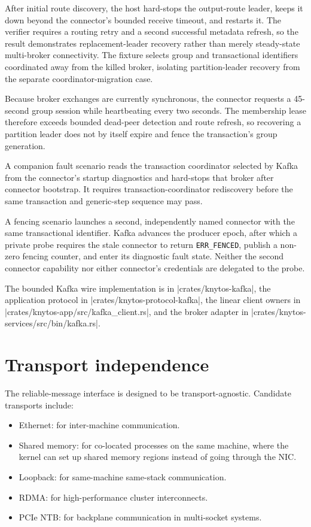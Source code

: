 After
initial route discovery, the host hard-stops the output-route leader, keeps it
down beyond the connector's bounded receive timeout, and restarts it. The
verifier requires a routing retry and a second successful metadata refresh, so the
result demonstrates replacement-leader recovery rather than merely
steady-state multi-broker connectivity. The fixture selects group and
transactional identifiers coordinated away from the killed broker, isolating
partition-leader recovery from the separate coordinator-migration case.

Because broker exchanges are currently synchronous, the connector requests a
45-second group session while heartbeating every two seconds. The membership
lease therefore exceeds bounded dead-peer detection and route refresh, so
recovering a partition leader does not by itself expire and fence the
transaction's group generation.

A companion fault scenario reads the transaction coordinator selected by
Kafka from the connector's startup diagnostics and hard-stops that broker
after connector bootstrap. It requires transaction-coordinator rediscovery
before the same transaction and generic-step sequence may pass.

A fencing scenario launches a second, independently named connector with the
same transactional identifier. Kafka advances the producer epoch, after which a private
probe requires the stale connector to return \texttt{ERR\_FENCED}, publish
a non-zero fencing counter, and enter its diagnostic fault state. Neither the
second connector capability nor either connector's credentials are delegated
to the probe.

The bounded Kafka wire implementation is in
\repodir|crates/knytos-kafka|, the application protocol in
\repodir|crates/knytos-protocol-kafka|, the linear client owners in
\repofile|crates/knytos-app/src/kafka_client.rs|, and the broker adapter in
\repofile|crates/knytos-services/src/bin/kafka.rs|.

\section{Transport independence}

The reliable-message interface is designed to be transport-agnostic. Candidate
transports include:

\begin{itemize}
    \item Ethernet: for inter-machine communication.
    \item Shared memory: for co-located processes on the same machine,
        where the kernel can set up shared memory regions instead of going through
        the NIC.
    \item Loopback: for same-machine same-stack communication.
    \item RDMA: for high-performance cluster interconnects.
    \item PCIe NTB: for backplane communication in multi-socket
        systems.
\end{itemize}

